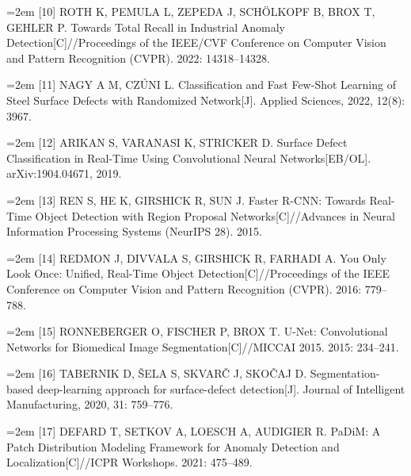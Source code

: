 {\small\noindent\hangindent=2em \hypertarget{ref:10}{}[10] ROTH K, PEMULA L, ZEPEDA J, SCHÖLKOPF B, BROX T, GEHLER P. Towards Total Recall in Industrial Anomaly Detection[C]//Proceedings of the IEEE/CVF Conference on Computer Vision and Pattern Recognition (CVPR). 2022: 14318–14328.\par}

{\small\noindent\hangindent=2em \hypertarget{ref:11}{}[11] NAGY A M, CZÚNI L. Classification and Fast Few-Shot Learning of Steel Surface Defects with Randomized Network[J]. Applied Sciences, 2022, 12(8): 3967.\par}

{\small\noindent\hangindent=2em \hypertarget{ref:12}{}[12] ARIKAN S, VARANASI K, STRICKER D. Surface Defect Classification in Real-Time Using Convolutional Neural Networks[EB/OL]. arXiv:1904.04671, 2019.\par}

{\small\noindent\hangindent=2em \hypertarget{ref:13}{}[13] REN S, HE K, GIRSHICK R, SUN J. Faster R-CNN: Towards Real-Time Object Detection with Region Proposal Networks[C]//Advances in Neural Information Processing Systems (NeurIPS 28). 2015.\par}

{\small\noindent\hangindent=2em \hypertarget{ref:14}{}[14] REDMON J, DIVVALA S, GIRSHICK R, FARHADI A. You Only Look Once: Unified, Real-Time Object Detection[C]//Proceedings of the IEEE Conference on Computer Vision and Pattern Recognition (CVPR). 2016: 779–788.\par}

{\small\noindent\hangindent=2em \hypertarget{ref:15}{}[15] RONNEBERGER O, FISCHER P, BROX T. U-Net: Convolutional Networks for Biomedical Image Segmentation[C]//MICCAI 2015. 2015: 234–241.\par}

{\small\noindent\hangindent=2em \hypertarget{ref:16}{}[16] TABERNIK D, ŠELA S, SKVARČ J, SKOČAJ D. Segmentation-based deep-learning approach for surface-defect detection[J]. Journal of Intelligent Manufacturing, 2020, 31: 759–776.\par}

{\small\noindent\hangindent=2em \hypertarget{ref:17}{}[17] DEFARD T, SETKOV A, LOESCH A, AUDIGIER R. PaDiM: A Patch Distribution Modeling Framework for Anomaly Detection and Localization[C]//ICPR Workshops. 2021: 475–489.\par}

